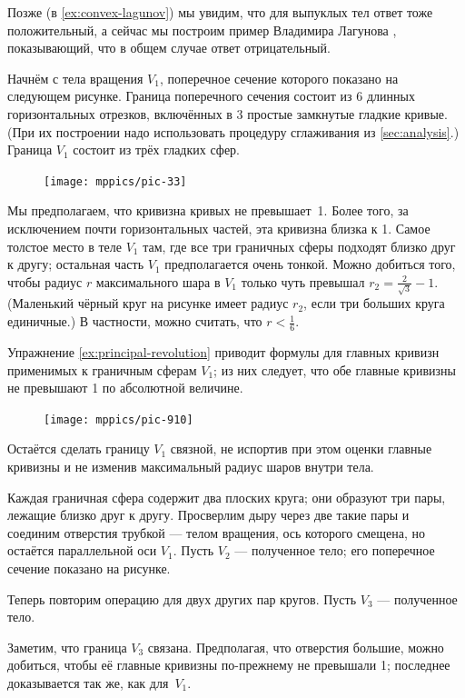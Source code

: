 Позже (в \ref{ex:convex-lagunov}) мы увидим, что для выпуклых тел ответ тоже положительный,
а сейчас мы построим пример Владимира Лагунова \cite{lagunov-1961}, показывающий, что в общем случае ответ отрицательный.

Начнём с тела вращения $V_1$, поперечное сечение которого показано на следующем рисунке.
Граница поперечного сечения состоит из 6 длинных горизонтальных отрезков, включённых в 3 простые замкнутые гладкие кривые.
(При их построении надо использовать процедуру сглаживания из \ref{sec:analysis}.)
Граница $V_1$ состоит из трёх гладких сфер.

\begin{figure}[hb!]
\centering
\texttt{[image: mppics/pic-33]}
\vskip0mm
\end{figure}

Мы предполагаем, что кривизна кривых не превышает~1.
Более того, за исключением почти горизонтальных частей, эта кривизна близка к 1.
Самое толстое место в теле $V_1$ там, где все три граничных сферы подходят близко друг к другу;
остальная часть $V_1$ предполагается очень тонкой.
Можно добиться того, чтобы радиус $r$ максимального шара в $V_1$ только чуть превышал $r_2=\tfrac2{\sqrt{3}}-1$.
(Маленький чёрный круг на рисунке имеет радиус $r_2$, если три больших круга единичные.)
В частности, можно считать, что $r<\tfrac16$.

Упражнение \ref{ex:principal-revolution} приводит формулы для главных кривизн применимых к граничным сферам $V_1$;
из них следует, что обе главные кривизны не превышают 1 по абсолютной величине.

\begin{figure}
\vskip-0mm
\centering
\texttt{[image: mppics/pic-910]}
\vskip0mm
\end{figure}

Остаётся сделать границу $V_1$ связной, не испортив при этом оценки главные кривизны и не изменив максимальный радиус шаров внутри тела.

Каждая граничная сфера содержит два плоских круга; они образуют три пары, лежащие близко друг к другу.
Просверлим дыру через две такие пары и соединим отверстия трубкой --- телом вращения, ось которого смещена, но остаётся параллельной оси $V_1$.
Пусть $V_2$ --- полученное тело; его поперечное сечение показано на рисунке.

Теперь повторим операцию для двух других пар кругов.
Пусть $V_3$ --- полученное тело.

Заметим, что граница $V_3$ связана.
Предполагая, что отверстия большие, можно добиться, чтобы её главные кривизны по-прежнему не превышали 1; последнее доказывается так же, как для~$V_1$.
\qeds


